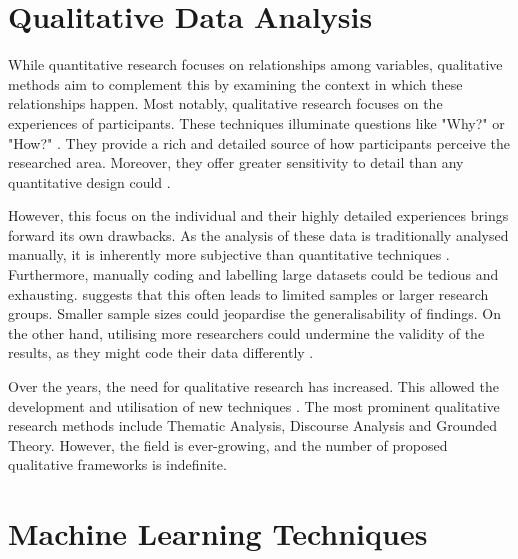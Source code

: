 \documentclass{l4proj}
\begin{document}
\section{Qualitative Data Analysis}
While quantitative research focuses on relationships among variables, qualitative methods aim to complement this by examining the context in which these relationships happen. Most notably, qualitative research focuses on the experiences of participants. These techniques illuminate questions like "Why?" or "How?" \citep{willig2017sage}. They provide a rich and detailed source of how participants perceive the researched area. Moreover, they offer greater sensitivity to detail than any quantitative design could \citep{janasik2009text, leopold2020opposites}.

However, this focus on the individual and their highly detailed experiences brings forward its own drawbacks. As the analysis of these data is traditionally analysed manually, it is inherently more subjective than quantitative techniques \citep{leopold2020opposites, crowston2012using}. Furthermore, manually coding and labelling large datasets could be tedious and exhausting. \cite{crowston2012using} suggests that this often leads to limited samples or larger research groups. Smaller sample sizes could jeopardise the generalisability of findings. On the other hand, utilising more researchers could undermine the validity of the results, as they might code their data differently \citep{crowston2012using}.

Over the years, the need for qualitative research has increased. This allowed the development and utilisation of new techniques \citep{willig2017sage}. The most prominent qualitative research methods include Thematic Analysis, Discourse Analysis and Grounded Theory. However, the field is ever-growing, and the number of proposed qualitative frameworks is indefinite.

\section{Machine Learning Techniques}
\end{document}
